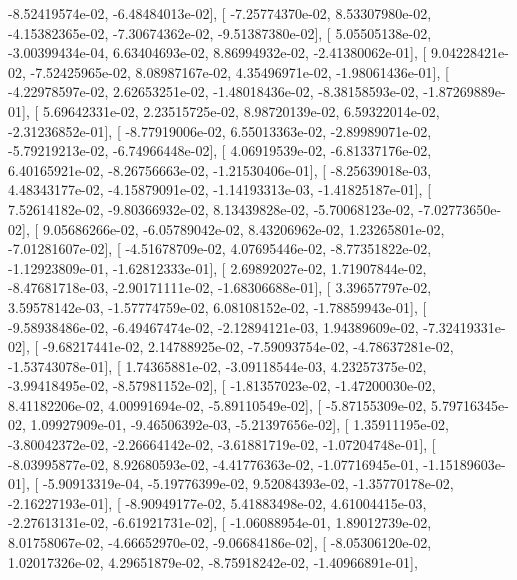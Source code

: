 \documentclass{article}
\begin{document}
         -8.52419574e-02,  -6.48484013e-02],
       [ -7.25774370e-02,   8.53307980e-02,  -4.15382365e-02,
         -7.30674362e-02,  -9.51387380e-02],
       [  5.05505138e-02,  -3.00399434e-04,   6.63404693e-02,
          8.86994932e-02,  -2.41380062e-01],
       [  9.04228421e-02,  -7.52425965e-02,   8.08987167e-02,
          4.35496971e-02,  -1.98061436e-01],
       [ -4.22978597e-02,   2.62653251e-02,  -1.48018436e-02,
         -8.38158593e-02,  -1.87269889e-01],
       [  5.69642331e-02,   2.23515725e-02,   8.98720139e-02,
          6.59322014e-02,  -2.31236852e-01],
       [ -8.77919006e-02,   6.55013363e-02,  -2.89989071e-02,
         -5.79219213e-02,  -6.74966448e-02],
       [  4.06919539e-02,  -6.81337176e-02,   6.40165921e-02,
         -8.26756663e-02,  -1.21530406e-01],
       [ -8.25639018e-03,   4.48343177e-02,  -4.15879091e-02,
         -1.14193313e-03,  -1.41825187e-01],
       [  7.52614182e-02,  -9.80366932e-02,   8.13439828e-02,
         -5.70068123e-02,  -7.02773650e-02],
       [  9.05686266e-02,  -6.05789042e-02,   8.43206962e-02,
          1.23265801e-02,  -7.01281607e-02],
       [ -4.51678709e-02,   4.07695446e-02,  -8.77351822e-02,
         -1.12923809e-01,  -1.62812333e-01],
       [  2.69892027e-02,   1.71907844e-02,  -8.47681718e-03,
         -2.90171111e-02,  -1.68306688e-01],
       [  3.39657797e-02,   3.59578142e-03,  -1.57774759e-02,
          6.08108152e-02,  -1.78859943e-01],
       [ -9.58938486e-02,  -6.49467474e-02,  -2.12894121e-03,
          1.94389609e-02,  -7.32419331e-02],
       [ -9.68217441e-02,   2.14788925e-02,  -7.59093754e-02,
         -4.78637281e-02,  -1.53743078e-01],
       [  1.74365881e-02,  -3.09118544e-03,   4.23257375e-02,
         -3.99418495e-02,  -8.57981152e-02],
       [ -1.81357023e-02,  -1.47200030e-02,   8.41182206e-02,
          4.00991694e-02,  -5.89110549e-02],
       [ -5.87155309e-02,   5.79716345e-02,   1.09927909e-01,
         -9.46506392e-03,  -5.21397656e-02],
       [  1.35911195e-02,  -3.80042372e-02,  -2.26664142e-02,
         -3.61881719e-02,  -1.07204748e-01],
       [ -8.03995877e-02,   8.92680593e-02,  -4.41776363e-02,
         -1.07716945e-01,  -1.15189603e-01],
       [ -5.90913319e-04,  -5.19776399e-02,   9.52084393e-02,
         -1.35770178e-02,  -2.16227193e-01],
       [ -8.90949177e-02,   5.41883498e-02,   4.61004415e-03,
         -2.27613131e-02,  -6.61921731e-02],
       [ -1.06088954e-01,   1.89012739e-02,   8.01758067e-02,
         -4.66652970e-02,  -9.06684186e-02],
       [ -8.05306120e-02,   1.02017326e-02,   4.29651879e-02,
         -8.75918242e-02,  -1.40966891e-01],
\end{document}
